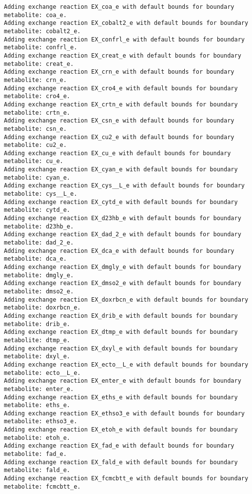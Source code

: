 \documentclass[
  letterpaper,
  DIV=11,
  numbers=noendperiod]{scrartcl}
\begin{document}
\begin{verbatim}
Adding exchange reaction EX_coa_e with default bounds for boundary metabolite: coa_e.
Adding exchange reaction EX_cobalt2_e with default bounds for boundary metabolite: cobalt2_e.
Adding exchange reaction EX_confrl_e with default bounds for boundary metabolite: confrl_e.
Adding exchange reaction EX_creat_e with default bounds for boundary metabolite: creat_e.
Adding exchange reaction EX_crn_e with default bounds for boundary metabolite: crn_e.
Adding exchange reaction EX_cro4_e with default bounds for boundary metabolite: cro4_e.
Adding exchange reaction EX_crtn_e with default bounds for boundary metabolite: crtn_e.
Adding exchange reaction EX_csn_e with default bounds for boundary metabolite: csn_e.
Adding exchange reaction EX_cu2_e with default bounds for boundary metabolite: cu2_e.
Adding exchange reaction EX_cu_e with default bounds for boundary metabolite: cu_e.
Adding exchange reaction EX_cyan_e with default bounds for boundary metabolite: cyan_e.
Adding exchange reaction EX_cys__L_e with default bounds for boundary metabolite: cys__L_e.
Adding exchange reaction EX_cytd_e with default bounds for boundary metabolite: cytd_e.
Adding exchange reaction EX_d23hb_e with default bounds for boundary metabolite: d23hb_e.
Adding exchange reaction EX_dad_2_e with default bounds for boundary metabolite: dad_2_e.
Adding exchange reaction EX_dca_e with default bounds for boundary metabolite: dca_e.
Adding exchange reaction EX_dmgly_e with default bounds for boundary metabolite: dmgly_e.
Adding exchange reaction EX_dmso2_e with default bounds for boundary metabolite: dmso2_e.
Adding exchange reaction EX_doxrbcn_e with default bounds for boundary metabolite: doxrbcn_e.
Adding exchange reaction EX_drib_e with default bounds for boundary metabolite: drib_e.
Adding exchange reaction EX_dtmp_e with default bounds for boundary metabolite: dtmp_e.
Adding exchange reaction EX_dxyl_e with default bounds for boundary metabolite: dxyl_e.
Adding exchange reaction EX_ecto__L_e with default bounds for boundary metabolite: ecto__L_e.
Adding exchange reaction EX_enter_e with default bounds for boundary metabolite: enter_e.
Adding exchange reaction EX_eths_e with default bounds for boundary metabolite: eths_e.
Adding exchange reaction EX_ethso3_e with default bounds for boundary metabolite: ethso3_e.
Adding exchange reaction EX_etoh_e with default bounds for boundary metabolite: etoh_e.
Adding exchange reaction EX_fad_e with default bounds for boundary metabolite: fad_e.
Adding exchange reaction EX_fald_e with default bounds for boundary metabolite: fald_e.
Adding exchange reaction EX_fcmcbtt_e with default bounds for boundary metabolite: fcmcbtt_e.

\end{verbatim}
\end{document}
